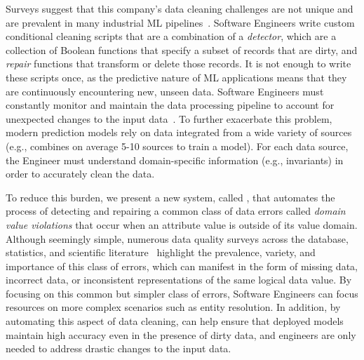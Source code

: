 Surveys suggest that this company's data cleaning challenges are not unique and are prevalent in many industrial ML pipelines~\cite{krishnan2016hilda}.  
Software Engineers write custom conditional cleaning scripts that are a combination of a {\it detector}, which are a collection of Boolean functions that specify a subset of records that are dirty, and {\it repair} functions that transform or delete those records.  It is not enough to write these scripts once, as the predictive nature of ML applications means that they are continuously encountering new, unseen data.
Software Engineers must constantly monitor and maintain the data processing pipeline to account for unexpected changes to the input data~\cite{sculley2014machine, DBLP:conf/sigmod/KrishnanFGWW16}.
To further exacerbate this problem, modern prediction models rely on data integrated from a wide variety of sources (e.g., \company combines on average 5-10 sources to train a model).  For each data source, the Engineer must understand domain-specific information (e.g., invariants) in order to accurately clean the data.

To reduce this burden, we present a new system, called \sys, that automates the process of detecting and repairing a common class of data errors called {\it domain value violations} that occur when an attribute value is outside of its value domain.  Although seemingly simple, numerous data quality surveys across the database, statistics, and scientific literature~\cite{muller2005problems,li2010improving,kim2003taxonomy,kandel2011research} highlight the prevalence, variety, and importance of this class of errors, which can manifest in the form of missing data, incorrect data, or inconsistent representations of the same logical data value.  By focusing on this common but simpler class of errors, Software Engineers can focus resources on more complex scenarios such as entity resolution.   In addition, by automating this aspect of data cleaning, \sys can help ensure that deployed models maintain high accuracy even in the presence of dirty data, and engineers are only needed to address drastic changes to the input data. 

